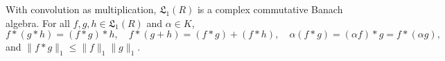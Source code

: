 With convolution as multiplication, $\mathfrak{L}_1(R)$ is a complex commutative Banach algebra. For all $f,g,h \in \mathfrak{L}_1(R)$ and $\alpha \in K$,
$$f * (g * h) = (f * g) * h, \quad f * (g + h) = (f * g) + (f * h), \quad \alpha (f * g) = (\alpha f) * g = f * (\alpha g),$$
and $\|f * g\|_1 \leq \|f\|_1 \|g\|_1$.
